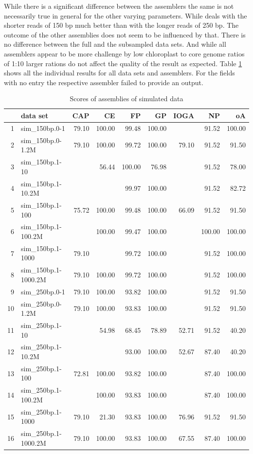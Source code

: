 While there is a significant difference between the assemblers the same is not necessarily true in general for
the other varying parameters. While \fp deals with the shorter reads of 150 bp much better than with the
longer reads of 250 bp. The outcome of the other assemblies does not seem to be influenced by that. There is
no difference between the full and the subsampled data sets. And while all assemblers appear to be more
challenge by low chloroplast to core genome ratios of 1:10 larger rations do not affect the quality of the
result as expected.  Table \ref{tab:scores_simulated} shows all the individual results for all data sets and
assemblers. For the fields with no entry the respective assembler failed to provide an output.


\begin{table}[ht]
\caption{Scores of assemblies of simulated data}
\label{tab:scores_simulated}
\centering
  \begin{tabular}{rlrrrrrrr}
 \hline
 & data set & CAP & CE & FP & GP & IOGA & NP & oA \\ 
 \hline
 1 & sim\_150bp.0-1 & 79.10 & 100.00 & 99.48 & 100.00 & & 91.52 & 100.00 \\ 
 2 & sim\_150bp.0-1.2M & 79.10 & 100.00 & 99.72 & 100.00 & 79.10 & 91.52 & 91.50 \\ 
 3 & sim\_150bp.1-10 & & 56.44 & 100.00 & 76.98 & & 91.52 & 78.00 \\ 
 4 & sim\_150bp.1-10.2M & & & 99.97 & 100.00 & & 91.52 & 82.72 \\ 
 5 & sim\_150bp.1-100 & 75.72 & 100.00 & 99.48 & 100.00 & 66.09 & 91.52 & 91.50 \\ 
 6 & sim\_150bp.1-100.2M & & 100.00 & 99.47 & 100.00 & & 100.00 & 100.00 \\ 
 7 & sim\_150bp.1-1000 & 79.10 & & 99.72 & 100.00 & & 91.52 & 100.00 \\ 
 8 & sim\_150bp.1-1000.2M & 79.10 & 100.00 & 99.72 & 100.00 & & 91.52 & 100.00 \\ 
 9 & sim\_250bp.0-1 & 79.10 & 100.00 & 93.82 & 100.00 & & 91.52 & 91.50 \\ 
 10 & sim\_250bp.0-1.2M & 79.10 & 100.00 & 93.83 & 100.00 & & 91.52 & 91.50 \\ 
 11 & sim\_250bp.1-10 & & 54.98 & 68.45 & 78.89 & 52.71 & 91.52 & 40.20 \\ 
 12 & sim\_250bp.1-10.2M & & & 93.00 & 100.00 & 52.67 & 87.40 & 40.20 \\ 
 13 & sim\_250bp.1-100 & 72.81 & 100.00 & 93.82 & 100.00 & & 87.40 & 100.00 \\ 
 14 & sim\_250bp.1-100.2M & & 100.00 & 93.83 & 100.00 & & 87.40 & 100.00 \\ 
 15 & sim\_250bp.1-1000 & 79.10 & 21.30 & 93.83 & 100.00 & 76.96 & 91.52 & 91.50 \\ 
 16 & sim\_250bp.1-1000.2M & 79.10 & 100.00 & 93.83 & 100.00 & 67.55 & 87.40 & 100.00 \\
 \hline
\end{tabular}%
\end{table}



